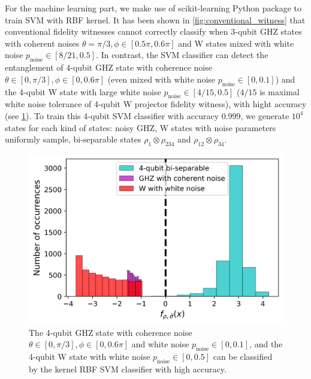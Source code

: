 \documentclass[
aps,
pra,
twocolumn,
floatfix,
]{revtex4-2}
\theoremstyle{plain}
\theoremstyle{definition}
\newcommand{\dm}{\rho}
\newcommand{\noise}{\text{noise}}
\begin{document}
For the machine learning part, we make use of scikit-learning Python package \cite{pedregosaScikitlearnMachineLearning2011} to train SVM with RBF kernel.
It has been shown in \cref{fig:conventional_witness} that conventional fidelity witnesses cannot correctly classify when 3-qubit GHZ states with coherent noises $\theta=\pi/3,\phi\in[0.5\pi,0.6\pi]$ and W states mixed with white noise $p_{\noise}\in[8/21,0.5]$.
In contrast, the SVM classifier can detect the entanglement of 4-qubit GHZ state with coherence noise $\theta\in[0,\pi/3], \phi\in[0,0.6\pi]$ (even mixed with white noise $p_\noise \in [0,0.1]$) and the 4-qubit W state with large white noise $p_{\noise}\in[4/15,0.5]$ ($4/15$ is maximal white noise tolerance of 4-qubit W projector fidelity witness), with hight accuracy (see \cref{fig:ml_compare}).
To train this 4-qubit SVM classifier with accuracy $0.999$, we generate $10^4$ states for each kind of states: noisy GHZ, W states with noise parameters uniformly sample, 
bi-separable states $\dm_{1}\otimes \dm_{234}$ and $\dm_{12}\otimes \dm_{34}$.
\begin{figure}[!ht]
	\centering
		\includegraphics[width=.9\linewidth]{./Code/three_qubit_hist_ML_4qubit.png}
	\caption{The 4-qubit GHZ state with coherence noise $\theta\in[0,\pi/3], \phi\in[0,0.6\pi]$ and white noise $p_{\noise}\in[0,0.1]$, and the 4-qubit W state with white noise $p_{\noise}\in[0,0.5]$ can be classified by the kernel RBF SVM classifier with high accuracy.}
	\label{fig:ml_compare}
\end{figure}
\end{document}

